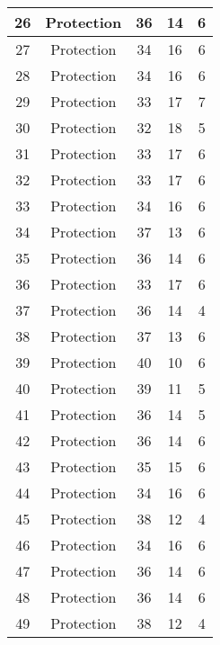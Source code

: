 \documentclass[results.tex]{subfiles}
\begin{document}
\begin{center}
\begin{tabular}{| c || c | c | c | c |}
    \hline
    26 & Protection & 36 & 14 & 6 \\ 
    \hline
    27 & Protection & 34 & 16 & 6 \\ 
    \hline
    28 & Protection & 34 & 16 & 6 \\ 
    \hline
    29 & Protection & 33 & 17 & 7 \\ 
    \hline
    30 & Protection & 32 & 18 & 5 \\ 
    \hline
    31 & Protection & 33 & 17 & 6 \\ 
    \hline
    32 & Protection & 33 & 17 & 6 \\ 
    \hline
    33 & Protection & 34 & 16 & 6 \\ 
    \hline
    34 & Protection & 37 & 13 & 6 \\ 
    \hline
    35 & Protection & 36 & 14 & 6 \\ 
    \hline
    36 & Protection & 33 & 17 & 6 \\ 
    \hline
    37 & Protection & 36 & 14 & 4 \\ 
    \hline
    38 & Protection & 37 & 13 & 6 \\ 
    \hline
    39 & Protection & 40 & 10 & 6 \\ 
    \hline
    40 & Protection & 39 & 11 & 5 \\ 
    \hline
    41 & Protection & 36 & 14 & 5 \\ 
    \hline
    42 & Protection & 36 & 14 & 6 \\ 
    \hline
    43 & Protection & 35 & 15 & 6 \\ 
    \hline
    44 & Protection & 34 & 16 & 6 \\ 
    \hline
    45 & Protection & 38 & 12 & 4 \\ 
    \hline
    46 & Protection & 34 & 16 & 6 \\ 
    \hline
    47 & Protection & 36 & 14 & 6 \\ 
    \hline
    48 & Protection & 36 & 14 & 6 \\ 
    \hline
    49 & Protection & 38 & 12 & 4 \\ 
    \hline   \end{tabular}
\end{center}
\end{document}
